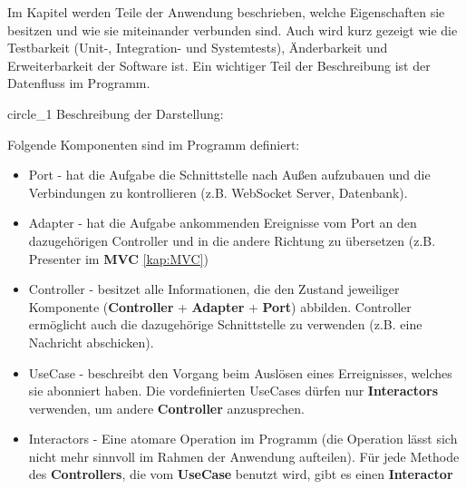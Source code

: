 Im Kapitel werden Teile der Anwendung beschrieben, welche Eigenschaften sie besitzen und wie sie miteinander verbunden sind.
Auch wird kurz gezeigt wie die Testbarkeit (Unit-, Integration- und Systemtests), 
Änderbarkeit und Erweiterbarkeit der Software ist.    
Ein wichtiger Teil der Beschreibung ist der Datenfluss im Programm.

{circle_1}
Beschreibung der Darstellung:

Folgende Komponenten sind im Programm definiert:
\begin{itemize}
    \item Port - hat die Aufgabe die Schnittstelle nach Außen aufzubauen und die Verbindungen zu kontrollieren (z.B. WebSocket Server, Datenbank).
    \item Adapter  - hat die Aufgabe ankommenden Ereignisse vom Port an den dazugehörigen Controller und in die andere Richtung zu übersetzen (z.B. Presenter im \textbf{MVC} \ref{kap:MVC})
    \item Controller - besitzet alle Informationen, die den Zustand jeweiliger Komponente (\textbf{Controller} + \textbf{Adapter} + \textbf{Port}) abbilden.
    Controller ermöglicht auch die dazugehörige Schnittstelle zu verwenden (z.B. eine Nachricht abschicken).
    \item UseCase - beschreibt den Vorgang beim Auslösen eines Erreignisses, welches sie abonniert haben. Die
    vordefinierten UseCases dürfen nur \textbf{Interactors} verwenden, um andere \textbf{Controller} anzusprechen.
    \item Interactors - Eine atomare Operation im Programm (die Operation lässt sich nicht mehr sinnvoll im Rahmen
    der Anwendung aufteilen). Für jede Methode des \textbf{Controllers}, 
    die vom \textbf{UseCase} benutzt wird, gibt es einen \textbf{Interactor}
\end{itemize}
